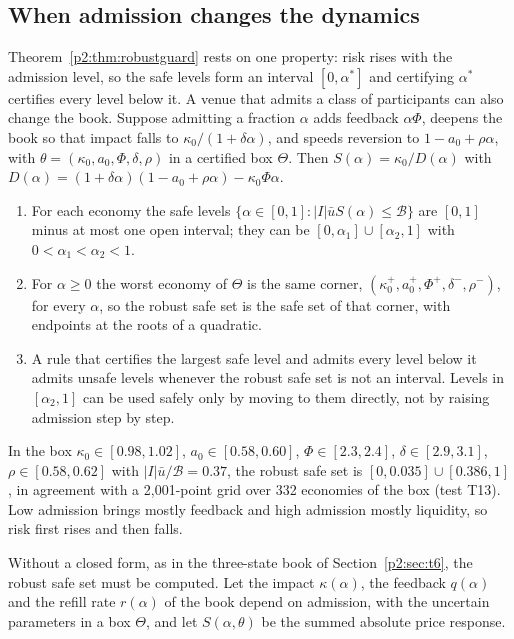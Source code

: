 \subsection{When admission changes the dynamics}\label{p2:sec:venue}
Theorem~\ref{p2:thm:robustguard} rests on one property: risk rises with the admission level, so the safe levels form an interval $[0,\alpha^*]$ and certifying $\alpha^*$ certifies every level below it. A venue that admits a class of participants can also change the book. Suppose admitting a fraction $\alpha$ adds feedback $\alpha\Phi$, deepens the book so that impact falls to $\kappa_0/(1+\delta\alpha)$, and speeds reversion to $1-a_0+\rho\alpha$, with $\theta=(\kappa_0,a_0,\Phi,\delta,\rho)$ in a certified box $\Theta$. Then $S(\alpha)=\kappa_0/D(\alpha)$ with $D(\alpha)=(1+\delta\alpha)(1-a_0+\rho\alpha)-\kappa_0\Phi\alpha$.

\begin{proposition}\label{p2:prop:venue}
\begin{enumerate}[label=(\roman*)]
\item For each economy the safe levels $\{\alpha\in[0,1]:|I|\bar uS(\alpha)\le\mathcal B\}$ are $[0,1]$ minus at most one open interval; they can be $[0,\alpha_1]\cup[\alpha_2,1]$ with $0<\alpha_1<\alpha_2<1$.
\item For $\alpha\ge0$ the worst economy of $\Theta$ is the same corner, $(\kappa_0^+,a_0^+,\Phi^+,\delta^-,\rho^-)$, for every $\alpha$, so the robust safe set is the safe set of that corner, with endpoints at the roots of a quadratic.
\item A rule that certifies the largest safe level and admits every level below it admits unsafe levels whenever the robust safe set is not an interval. Levels in $[\alpha_2,1]$ can be used safely only by moving to them directly, not by raising admission step by step.
\end{enumerate}
\end{proposition}

In the box $\kappa_0\in[0.98,1.02]$, $a_0\in[0.58,0.60]$, $\Phi\in[2.3,2.4]$, $\delta\in[2.9,3.1]$, $\rho\in[0.58,0.62]$ with $|I|\bar u/\mathcal B=0.37$, the robust safe set is $[0,0.035]\cup[0.386,1]$, in agreement with a 2{,}001-point grid over 332 economies of the box (test T13). Low admission brings mostly feedback and high admission mostly liquidity, so risk first rises and then falls.

Without a closed form, as in the three-state book of Section~\ref{p2:sec:t6}, the robust safe set must be computed. Let the impact $\kappa(\alpha)$, the feedback $q(\alpha)$ and the refill rate $r(\alpha)$ of the book depend on admission, with the uncertain parameters in a box $\Theta$, and let $S(\alpha,\theta)$ be the summed absolute price response.

